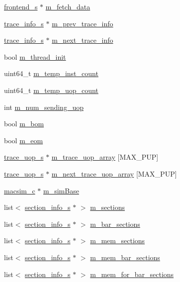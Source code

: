 \begin{DoxyCompactItemize}
\item 
\hyperlink{structfrontend__s}{frontend\_\-s} $\ast$ \hyperlink{structthread__s_abf181f7d6a5596629a4237ab78b68497}{m\_\-fetch\_\-data}
\item 
\hyperlink{structtrace__info__s}{trace\_\-info\_\-s} $\ast$ \hyperlink{structthread__s_a978fea511dd7c2d9076e06d81a675b9f}{m\_\-prev\_\-trace\_\-info}
\item 
\hyperlink{structtrace__info__s}{trace\_\-info\_\-s} $\ast$ \hyperlink{structthread__s_a484d73110277c89a874cb1c681c916fc}{m\_\-next\_\-trace\_\-info}
\item 
bool \hyperlink{structthread__s_afc7f4beee3959a7a0e9a783f01094902}{m\_\-thread\_\-init}
\item 
uint64\_\-t \hyperlink{structthread__s_ac7cf96053872c92c7f1b0b2488969ab7}{m\_\-temp\_\-inst\_\-count}
\item 
uint64\_\-t \hyperlink{structthread__s_aec816b397664eb8afeedab515c5afe8d}{m\_\-temp\_\-uop\_\-count}
\item 
int \hyperlink{structthread__s_a7d27d154f05ae450db08ae51e576d2fd}{m\_\-num\_\-sending\_\-uop}
\item 
bool \hyperlink{structthread__s_afae2ee7a8bd0adf9a6c544eed103c440}{m\_\-bom}
\item 
bool \hyperlink{structthread__s_a771e92a9ef2ecc972ccc647f3d2d4f3d}{m\_\-eom}
\item 
\hyperlink{structtrace__uop__s}{trace\_\-uop\_\-s} $\ast$ \hyperlink{structthread__s_a3a1828ec963fd0cba7c0ea8fd96699eb}{m\_\-trace\_\-uop\_\-array} \mbox{[}MAX\_\-PUP\mbox{]}
\item 
\hyperlink{structtrace__uop__s}{trace\_\-uop\_\-s} $\ast$ \hyperlink{structthread__s_acb1122a59e5a61681b95987404c52789}{m\_\-next\_\-trace\_\-uop\_\-array} \mbox{[}MAX\_\-PUP\mbox{]}
\item 
\hyperlink{classmacsim__c}{macsim\_\-c} $\ast$ \hyperlink{structthread__s_a95470a3e9e20649f4228016776325938}{m\_\-simBase}
\item 
list$<$ \hyperlink{structsection__info__s}{section\_\-info\_\-s} $\ast$ $>$ \hyperlink{structthread__s_acbb56db74b9ba52acb14437d6f9e0231}{m\_\-sections}
\item 
list$<$ \hyperlink{structsection__info__s}{section\_\-info\_\-s} $\ast$ $>$ \hyperlink{structthread__s_a854a6eb1c6bb1aacfdf3c24cf9b1a037}{m\_\-bar\_\-sections}
\item 
list$<$ \hyperlink{structsection__info__s}{section\_\-info\_\-s} $\ast$ $>$ \hyperlink{structthread__s_a34206b2835435191b813c943cf4d6c1b}{m\_\-mem\_\-sections}
\item 
list$<$ \hyperlink{structsection__info__s}{section\_\-info\_\-s} $\ast$ $>$ \hyperlink{structthread__s_ac0e1546f48c08ecb93fcebbb2ea53d35}{m\_\-mem\_\-bar\_\-sections}
\item 
list$<$ \hyperlink{structsection__info__s}{section\_\-info\_\-s} $\ast$ $>$ \hyperlink{structthread__s_a9bf8a0cc4da3251e3fb81372f28b7426}{m\_\-mem\_\-for\_\-bar\_\-sections}
\end{DoxyCompactItemize}


